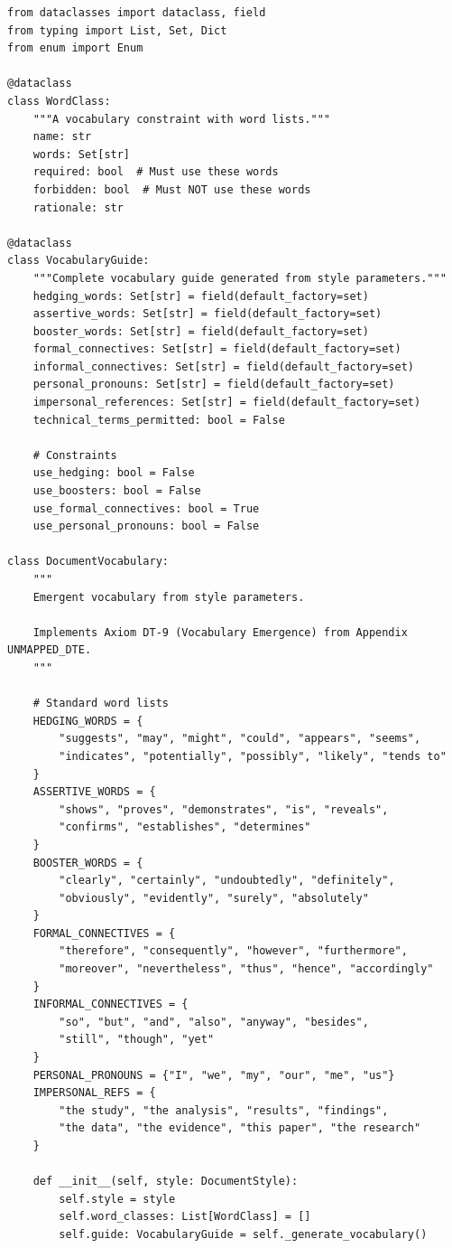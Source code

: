 \begin{verbatim}
from dataclasses import dataclass, field
from typing import List, Set, Dict
from enum import Enum

@dataclass
class WordClass:
    """A vocabulary constraint with word lists."""
    name: str
    words: Set[str]
    required: bool  # Must use these words
    forbidden: bool  # Must NOT use these words
    rationale: str

@dataclass
class VocabularyGuide:
    """Complete vocabulary guide generated from style parameters."""
    hedging_words: Set[str] = field(default_factory=set)
    assertive_words: Set[str] = field(default_factory=set)
    booster_words: Set[str] = field(default_factory=set)
    formal_connectives: Set[str] = field(default_factory=set)
    informal_connectives: Set[str] = field(default_factory=set)
    personal_pronouns: Set[str] = field(default_factory=set)
    impersonal_references: Set[str] = field(default_factory=set)
    technical_terms_permitted: bool = False

    # Constraints
    use_hedging: bool = False
    use_boosters: bool = False
    use_formal_connectives: bool = True
    use_personal_pronouns: bool = False

class DocumentVocabulary:
    """
    Emergent vocabulary from style parameters.

    Implements Axiom DT-9 (Vocabulary Emergence) from Appendix UNMAPPED_DTE.
    """

    # Standard word lists
    HEDGING_WORDS = {
        "suggests", "may", "might", "could", "appears", "seems",
        "indicates", "potentially", "possibly", "likely", "tends to"
    }
    ASSERTIVE_WORDS = {
        "shows", "proves", "demonstrates", "is", "reveals",
        "confirms", "establishes", "determines"
    }
    BOOSTER_WORDS = {
        "clearly", "certainly", "undoubtedly", "definitely",
        "obviously", "evidently", "surely", "absolutely"
    }
    FORMAL_CONNECTIVES = {
        "therefore", "consequently", "however", "furthermore",
        "moreover", "nevertheless", "thus", "hence", "accordingly"
    }
    INFORMAL_CONNECTIVES = {
        "so", "but", "and", "also", "anyway", "besides",
        "still", "though", "yet"
    }
    PERSONAL_PRONOUNS = {"I", "we", "my", "our", "me", "us"}
    IMPERSONAL_REFS = {
        "the study", "the analysis", "results", "findings",
        "the data", "the evidence", "this paper", "the research"
    }

    def __init__(self, style: DocumentStyle):
        self.style = style
        self.word_classes: List[WordClass] = []
        self.guide: VocabularyGuide = self._generate_vocabulary()


\end{verbatim}

